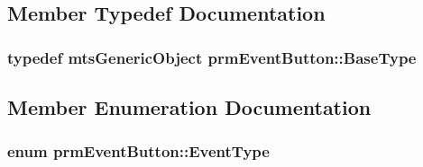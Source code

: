 \subsection{Member Typedef Documentation}
\hypertarget{classprm_event_button_ad7f93b9f9585c48633382b39d118c151}{
\subsubsection[{Base\-Type}]{\setlength{\rightskip}{0pt plus 5cm}typedef {\bf mts\-Generic\-Object} {\bf prm\-Event\-Button\-::\-Base\-Type}}}\label{classprm_event_button_ad7f93b9f9585c48633382b39d118c151}


\subsection{Member Enumeration Documentation}
\hypertarget{classprm_event_button_ad25147a00b664a6df0de483dad956b0b}{
\subsubsection[{Event\-Type}]{\setlength{\rightskip}{0pt plus 5cm}enum {\bf prm\-Event\-Button\-::\-Event\-Type}}}\label{classprm_event_button_ad25147a00b664a6df0de483dad956b0b}
